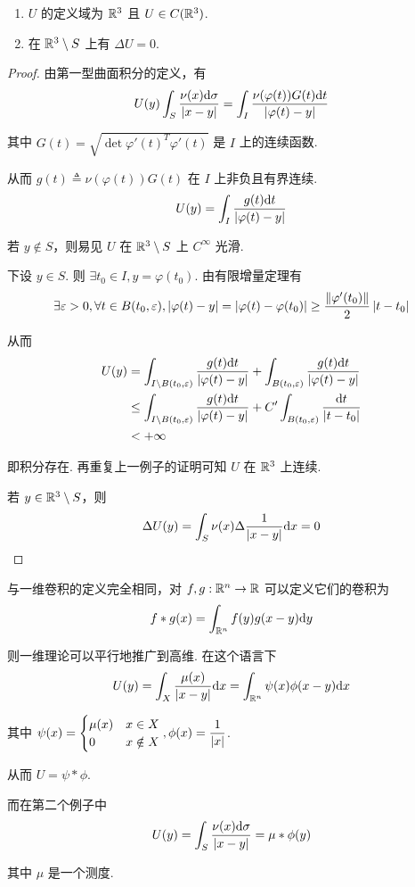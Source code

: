 \begin{property}
    \begin{enumerate}
        \item $U$ 的定义域为 $\mathbb{R}^3$ 且 $U\in C(\mathbb{R}^3)$.
        
        \item 在 $\mathbb{R}^3\setminus S$ 上有 $\Delta U=0$.
    \end{enumerate}
\end{property}
\begin{proof}
    由第一型曲面积分的定义，有
$$
U(y)\int_S\frac{\nu(x)\mathrm{d}\sigma}{\left\lvert{x-y}\right\rvert}=\int_I\frac{\nu(\varphi(t))G(t)\mathrm{d} t}{\left\lvert{\varphi(t)-y}\right\rvert}
$$

    其中 $G(t)=\displaystyle\sqrt{\det\varphi'(t)^T\varphi'(t)}$ 是 $I$ 上的连续函数.

    从而 $g(t)\triangleq\nu(\varphi(t))G(t)$ 在 $I$ 上非负且有界连续.
$$
U(y)=\int_I\frac{g(t)\mathrm{d} t}{\left\lvert{\varphi(t)-y}\right\rvert}
$$

    若 $y\notin S$，则易见 $U$ 在 $\mathbb{R}^3\setminus S$ 上 $C^\infty$ 光滑.

    下设 $y\in S$. 则 $\exists t_0\in I,y=\varphi(t_0)$. 由有限增量定理有
$$
\exists\varepsilon>0,\forall t\in B(t_0,\varepsilon),\left\lvert{\varphi(t)-y}\right\rvert=\left\lvert{\varphi(t)-\varphi(t_0)}\right\rvert\ge\frac{\left\lVert{\varphi'(t_0)}\right\rVert}{2}\left\lvert{t-t_0}\right\rvert
$$

    从而
$$
\begin{aligned}
    U(y)&=\int_{I\setminus B(t_0,\varepsilon)}\frac{g(t)\mathrm{d} t}{\left\lvert{\varphi(t)-y}\right\rvert}+\int_{B(t_0,\varepsilon)}\frac{g(t)\mathrm{d} t}{\left\lvert{\varphi(t)-y}\right\rvert}\\
    &\le\int_{I\setminus B(t_0,\varepsilon)}\frac{g(t)\mathrm{d} t}{\left\lvert{\varphi(t)-y}\right\rvert}+C'\int_{B(t_0,\varepsilon)}\frac{\mathrm{d} t}{\left\lvert{t-t_0}\right\rvert}\\
    &<+\infty
\end{aligned}
$$

    即积分存在. 再重复上一例子的证明可知 $U$ 在 $\mathbb{R}^3$ 上连续.

    若 $y\in\mathbb{R}^3\setminus S$，则
$$
\Delta U(y)=\int_S\nu(x)\Delta\frac{1}{\left\lvert{x-y}\right\rvert}\mathrm{d} x=0
$$
\end{proof}

\begin{hint}
    与一维卷积的定义完全相同，对 $f,g:\mathbb{R}^n\to\mathbb{R}$ 可以定义它们的卷积为
$$
f*g(x)=\int_{\mathbb{R}^n}f(y)g(x-y)\mathrm{d} y
$$

    则一维理论可以平行地推广到高维. 在这个语言下
$$
U(y)=\int_X\frac{\mu(x)}{\left\lvert{x-y}\right\rvert}\mathrm{d} x=\int_{\mathbb{R}^n}\psi(x)\phi(x-y)\mathrm{d} x
$$

    其中 $\psi(x)=\begin{cases}
        \mu(x) & x\in X\\
        0 & x\notin X
    \end{cases},\phi(x)=\dfrac{1}{\left\lvert{x}\right\rvert}$.

    从而 $U=\psi*\phi$.

    而在第二个例子中
$$
U(y)=\int_S\frac{\nu(x)\mathrm{d}\sigma}{\left\lvert{x-y}\right\rvert}=\mu*\phi(y)
$$

    其中 $\mu$ 是一个测度.
\end{hint}